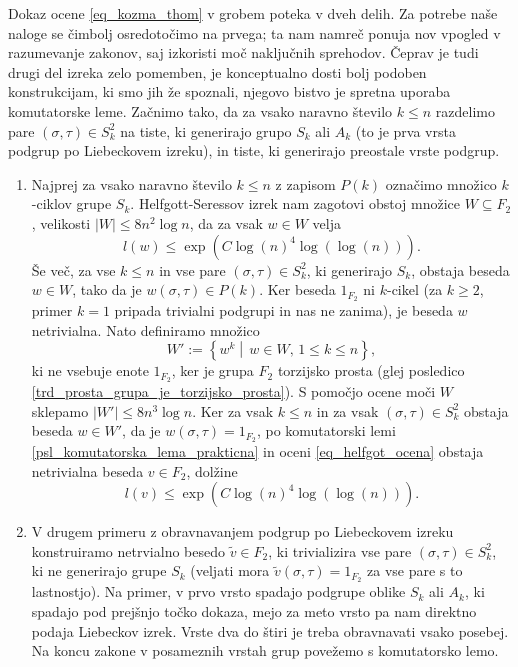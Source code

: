 Dokaz ocene \ref{eq_kozma_thom} v grobem poteka v dveh delih. Za potrebe naše naloge se čimbolj osredotočimo na prvega; ta nam namreč ponuja nov vpogled v razumevanje zakonov,
saj izkoristi moč naključnih sprehodov. Čeprav je tudi drugi del izreka zelo pomemben, je konceptualno dosti bolj podoben konstrukcijam, ki smo jih že spoznali, njegovo bistvo je spretna uporaba komutatorske leme.
 Začnimo tako, da za vsako naravno število $k \le n$ razdelimo pare $(\sigma, \tau) \in S_k^2$ na tiste,
ki generirajo grupo $S_k$ ali $A_k$ (to je prva vrsta podgrup po Liebeckovem izreku), in tiste, ki generirajo preostale vrste podgrup.
\begin{enumerate}
    \item Najprej za vsako naravno število $k \le n$ z zapisom $P(k)$ označimo množico $k$-ciklov grupe $S_k$. Helfgott-Seressov izrek nam zagotovi obstoj množice $W \subseteq F_2$, velikosti $\lvert W \rvert \le 8n^2 \log n$, da za vsak $w \in W$ velja \begin{equation}\label{eq_helfgot_ocena}
        l(w) \le \exp(C \log(n)^{4} \log(\log(n))).
    \end{equation}  
    Še več, za vse $k \le n$ in vse pare $(\sigma, \tau) \in S_k^2$, ki generirajo $S_k$,
    obstaja beseda $w \in W$, tako da je $w(\sigma, \tau) \in P(k)$. Ker beseda $1_{F_2}$ ni $k$-cikel (za $k \ge 2$, primer $k = 1$ pripada trivialni podgrupi in nas ne zanima), je beseda $w$ netrivialna. Nato definiramo množico \begin{equation*}
    W' := \left\{ w^{k}  \middle|\,  w \in W , \, 1 \le  k \le  n \right\}, 
    \end{equation*}  
    ki ne vsebuje enote $1_{F_2}$, ker je grupa $F_2$ torzijsko prosta (glej posledico \ref{trd_prosta_grupa_je_torzijsko_prosta}). S pomočjo ocene moči $W$ sklepamo $\lvert W' \rvert \le 8 n^3 \log n$.
    Ker za vsak $k \le n$ in za vsak $(\sigma, \tau) \in S_k^2$ obstaja beseda $w \in W'$, da je $w(\sigma, \tau) = 1_{F_2}$, po komutatorski lemi \ref{psl_komutatorska_lema_prakticna} in oceni \ref{eq_helfgot_ocena} obstaja netrivialna beseda $v \in F_2$, dolžine
    \begin{equation*}
    l(v) \le \exp(C \log(n)^{4} \log(\log(n))).
    \end{equation*}  
    \item V drugem primeru z obravnavanjem podgrup po Liebeckovem izreku konstruiramo netrvialno besedo $\tilde{v} \in F_2$, ki trivializira vse pare $(\sigma, \tau) \in S_k^2$, ki ne generirajo
    grupe $S_k$ (veljati mora $\tilde{v}(\sigma, \tau) = 1_{F_2}$ za vse pare s to lastnostjo). Na primer, v prvo vrsto spadajo podgrupe oblike $S_k$ ali $A_k$, ki spadajo pod prejšnjo točko dokaza, mejo za meto vrsto pa nam direktno podaja Liebeckov izrek. Vrste dva do štiri je treba obravnavati
    vsako posebej. Na koncu zakone v posameznih vrstah grup povežemo s komutatorsko lemo.    
\end{enumerate}

